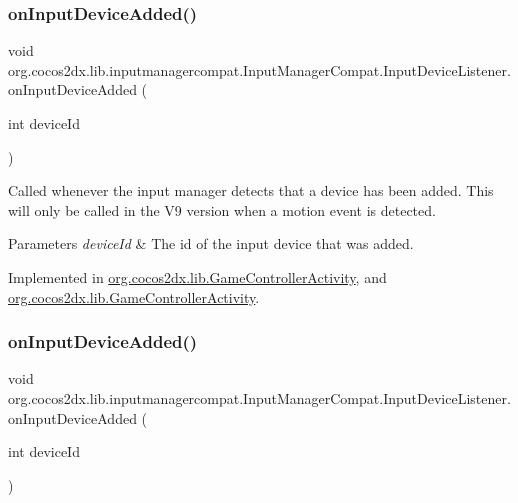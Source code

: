 \subsubsection{\texorpdfstring{on\+Input\+Device\+Added()}{onInputDeviceAdded()}\hspace{0.1cm}{\footnotesize\ttfamily [1/2]}}
{\footnotesize\ttfamily void org.\+cocos2dx.\+lib.\+inputmanagercompat.\+Input\+Manager\+Compat.\+Input\+Device\+Listener.\+on\+Input\+Device\+Added (\begin{DoxyParamCaption}\item[{int}]{device\+Id }\end{DoxyParamCaption})}

Called whenever the input manager detects that a device has been added. This will only be called in the V9 version when a motion event is detected.


\begin{DoxyParams}{Parameters}
{\em device\+Id} & The id of the input device that was added. \\
\hline
\end{DoxyParams}


Implemented in \hyperlink{classorg_1_1cocos2dx_1_1lib_1_1GameControllerActivity_a25ed4cb26b6bac381d1befce69f7e638}{org.\+cocos2dx.\+lib.\+Game\+Controller\+Activity}, and \hyperlink{classorg_1_1cocos2dx_1_1lib_1_1GameControllerActivity_a25ed4cb26b6bac381d1befce69f7e638}{org.\+cocos2dx.\+lib.\+Game\+Controller\+Activity}.

\mbox{\label{interfaceorg_1_1cocos2dx_1_1lib_1_1inputmanagercompat_1_1InputManagerCompat_1_1InputDeviceListener_aade58bcb9003c24590ac0907d66406dc}} 
\subsubsection{\texorpdfstring{on\+Input\+Device\+Added()}{onInputDeviceAdded()}\hspace{0.1cm}{\footnotesize\ttfamily [2/2]}}
{\footnotesize\ttfamily void org.\+cocos2dx.\+lib.\+inputmanagercompat.\+Input\+Manager\+Compat.\+Input\+Device\+Listener.\+on\+Input\+Device\+Added (\begin{DoxyParamCaption}\item[{int}]{device\+Id }\end{DoxyParamCaption})}

